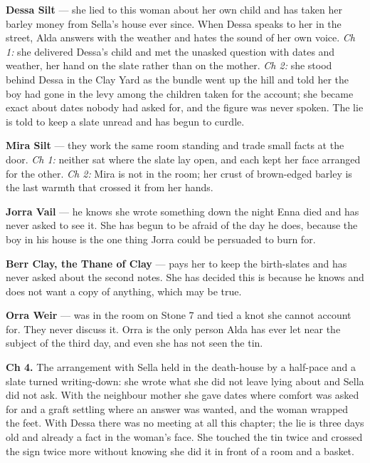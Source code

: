 \documentclass{design/chronicle}
\begin{document}
{\textbf{Dessa Silt} — she lied to this woman about her own child and has taken her barley money from Sella’s house ever since. When Dessa speaks to her in the street, Alda answers with the weather and hates the sound of her own voice. \emph{Ch 1:} she delivered Dessa’s child and met the unasked question with dates and weather, her hand on the slate rather than on the mother. \emph{Ch 2:} she stood behind Dessa in the Clay Yard as the bundle went up the hill and told her the boy had gone in the levy among the children taken for the account; she became exact about dates nobody had asked for, and the figure was never spoken. The lie is told to keep a slate unread and has begun to curdle.

\textbf{Mira Silt} — they work the same room standing and trade small facts at the door. \emph{Ch 1:} neither sat where the slate lay open, and each kept her face arranged for the other. \emph{Ch 2:} Mira is not in the room; her crust of brown-edged barley is the last warmth that crossed it from her hands.

\textbf{Jorra Vail} — he knows she wrote something down the night Enna died and has never asked to see it. She has begun to be afraid of the day he does, because the boy in his house is the one thing Jorra could be persuaded to burn for.

\textbf{Berr Clay, the Thane of Clay} — pays her to keep the birth-slates and has never asked about the second notes. She has decided this is because he knows and does not want a copy of anything, which may be true.

\textbf{Orra Weir} — was in the room on Stone 7 and tied a knot she cannot account for. They never discuss it. Orra is the only person Alda has ever let near the subject of the third day, and even she has not seen the tin.

\textbf{Ch 4.} The arrangement with Sella held in the death-house by a half-pace and a slate turned writing-down: she wrote what she did not leave lying about and Sella did not ask. With the neighbour mother she gave dates where comfort was asked for and a graft settling where an answer was wanted, and the woman wrapped the feet. With Dessa there was no meeting at all this chapter; the lie is three days old and already a fact in the woman’s face. She touched the tin twice and crossed the sign twice more without knowing she did it in front of a room and a basket.

}
\end{document}
